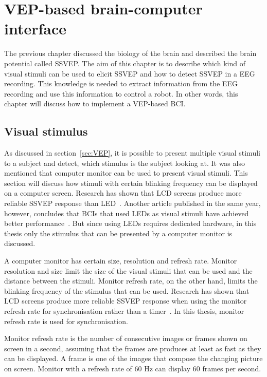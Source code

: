 
\chapter{VEP-based brain-computer interface}

The previous chapter discussed the biology of the brain and described the brain potential called \gls{SSVEP}. The aim of this chapter is to describe which kind of visual stimuli can be used to elicit \gls{SSVEP} and how to detect \gls{SSVEP} in a \gls{EEG} recording. This knowledge is needed to extract information from the \gls{EEG} recording and use this information to control a robot. In other words, this chapter will discuss how to implement a \gls{VEP}-based \gls{BCI}.

\section{Visual stimulus}
\label{sec:stimuli}

As discussed in section~\ref{sec:VEP}, it is possible to present multiple visual stimuli to a subject and detect, which stimulus is the subject looking at. It was also mentioned that computer monitor can be used to present visual stimuli. This section will discuss how stimuli with certain blinking frequency can be displayed on a computer screen. Research has shown that LCD screens produce more reliable \gls{SSVEP} response than \gls{LED}~\cite{lcd_lcd_led}. Another article published in the same year, however, concludes that \glspl{BCI} that used \glspl{LED} as visual stimuli have achieved better performance~\cite{ssvep_stim}. But since using \glspl{LED} requires dedicated hardware, in this thesis only the stimulus that can be presented by a computer monitor is discussed.

A computer monitor has certain size, resolution and refresh rate. Monitor resolution and size limit the size of the visual stimuli that can be used and the distance between the stimuli. Monitor refresh rate, on the other hand, limits the blinking frequency of the stimulus that can be used. Research has shown that LCD screens produce more reliable \gls{SSVEP} response when using the monitor refresh rate for synchronisation rather than a timer~\cite{lcd_lcd_led}. In this thesis, monitor refresh rate is used for synchronisation.

Monitor refresh rate is the number of consecutive images or frames shown on screen in a second, assuming that the frames are produces at least as fast as they can be displayed. A frame is one of the images that compose the changing picture on screen. Monitor with a refresh rate of 60 Hz can display 60 frames per second. 


